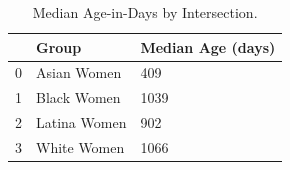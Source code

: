 \begin{table}[htbp]
\centering
\caption{Median Age-in-Days by Intersection.}
\label{tab:eda_age_days_by_group}
\begin{tabular}{lll}
\toprule
 & Group & Median Age (days) \\
\midrule
0 & Asian Women & 409 \\
1 & Black Women & 1039 \\
2 & Latina Women & 902 \\
3 & White Women & 1066 \\
\bottomrule
\end{tabular}

\end{table}